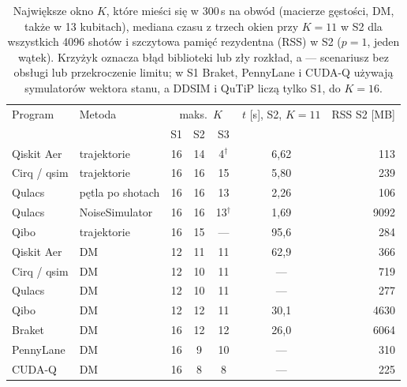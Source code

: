 \begin{table}[t]
\caption{Największe okno $K$, które mieści się w 300\,s na obwód (macierze gęstości, DM, także w 13 kubitach), mediana czasu z trzech okien przy $K = 11$ w S2 dla wszystkich 4096 shotów i szczytowa pamięć rezydentna (RSS) w S2 ($p = 1$, jeden wątek). Krzyżyk oznacza błąd biblioteki lub zły rozkład, a --- scenariusz bez obsługi lub przekroczenie limitu; w S1 Braket, PennyLane i CUDA-Q używają symulatorów wektora stanu, a DDSIM i QuTiP liczą tylko S1, do $K = 16$.}
\label{tab:t6}
\centering
\small
\begin{tabular}{llccccr}
\toprule
Program & Metoda & \multicolumn{3}{c}{maks.\ $K$} & $t$ [s], S2, $K = 11$ & RSS S2 [MB] \\
 & & S1 & S2 & S3 & & \\
\midrule
Qiskit Aer & trajektorie & 16 & 14 & 4$^\dagger$ & 6,62 & 113 \\
Cirq / qsim & trajektorie & 16 & 16 & 15 & 5,80 & 239 \\
Qulacs & pętla po shotach & 16 & 16 & 13 & 2,26 & 106 \\
Qulacs & NoiseSimulator & 16 & 16 & 13$^\dagger$ & 1,69 & 9092 \\
Qibo & trajektorie & 16 & 15 & --- & 95,6 & 284 \\
Qiskit Aer & DM & 12 & 11 & 11 & 62,9 & 366 \\
Cirq / qsim & DM & 12 & 10 & 11 & --- & 719 \\
Qulacs & DM & 12 & 10 & 11 & --- & 277 \\
Qibo & DM & 12 & 12 & 11 & 30,1 & 4630 \\
Braket & DM & 16 & 12 & 12 & 26,0 & 6064 \\
PennyLane & DM & 16 & 9 & 10 & --- & 310 \\
CUDA-Q & DM & 16 & 8 & 8 & --- & 225 \\
\bottomrule
\end{tabular}
\end{table}
